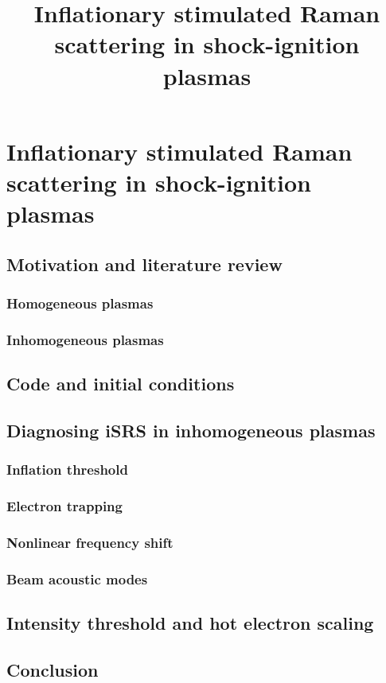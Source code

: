 \chapter{Inflationary stimulated Raman scattering in shock-ignition plasmas}
\label{chp:iSRS}

\title{Inflationary stimulated Raman scattering in shock-ignition plasmas}

\section{Motivation and literature review}
\subsection{Homogeneous plasmas}
\subsection{Inhomogeneous plasmas}

\section{Code and initial conditions}\label{sec:code&IC}

\section{Diagnosing iSRS in inhomogeneous plasmas}\label{sec:signatures}
\subsection{Inflation threshold}
\subsection{Electron trapping}
\subsection{Nonlinear frequency shift}
\subsection{Beam acoustic modes}

\section{Intensity threshold and hot electron scaling}\label{sec:paramScan}

\section{Conclusion}\label{sec:conclusion}





